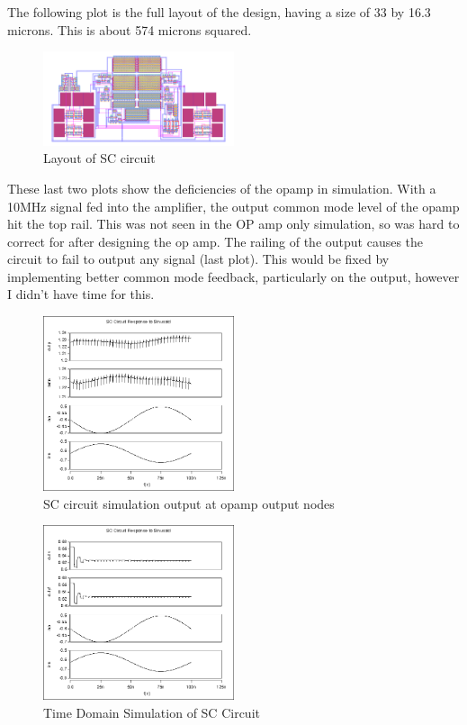 \documentclass[conference]{IEEEtran}
\begin{document}
The following plot is the full layout of the design, having a size of 33 by 16.3 microns. This is about 574 microns squared.


\FloatBarrier
\begin{figure}[htb]
\centering
\includegraphics[width=0.5\textwidth]{sc_layout.png}
\caption{Layout of SC circuit}
\label{folded}
\end{figure}
\FloatBarrier
These last two plots show the deficiencies of the opamp in simulation. With a 10MHz signal fed into the amplifier, the output common mode level of the opamp hit the top rail. This was not seen in the OP amp only simulation, so was hard to correct for after designing the op amp. The railing of the output causes the circuit to fail to output any signal (last plot). This would be fixed by implementing better common mode feedback, particularly on the output, however I didn't have time for this.
\FloatBarrier
\begin{figure}[htb]
\centering
\includegraphics[width=0.5\textwidth]{fgh.png}
\caption{SC circuit simulation output at opamp output nodes}
\label{folded}
\end{figure}
\FloatBarrier

\FloatBarrier
\begin{figure}[htb]
\centering
\includegraphics[width=0.5\textwidth]{outputsim.png}
\caption{Time Domain Simulation of SC Circuit}
\label{folded}
\end{figure}
\FloatBarrier
\end{document}
